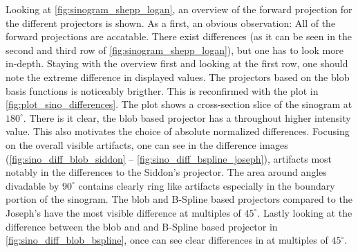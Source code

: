 Looking at \autoref{fig:sinogram_shepp_logan}, an overview of the forward projection for the
different projectors is shown. As a first, an obvious observation: All of the forward projections
are accatable. There exist differences (as it can be seen in the second and third row of
\autoref{fig:sinogram_shepp_logan}), but one has to look more in-depth. Staying with the overview
first and looking at the first row, one should note the extreme difference in displayed values. The
projectors based on the blob basis functions is noticeably brigther. This is reconfirmed with the
plot in \autoref{fig:plot_sino_differences}. The plot shows a cross-section slice of the sinogram at
\(180^\circ\). There is it clear, the blob based projector has a throughout higher intensity value.
This also motivates the choice of absolute normalized differences. Focusing on the overall visible
artifacts, one can see in the difference images
(\autoref{fig:sino_diff_blob_siddon} -- \autoref{fig:sino_diff_bspline_joseph}), artifacts most
notably in the differences to the Siddon's projector. The area around angles divadable by
\(90^\circ\) contains clearly ring like artifacts especially in the boundary portion of the
sinogram. The blob and B-Spline based projectors compared to the Joseph's have the most visible
difference at multiples of \(45^\circ\).
Lastly looking at the difference between the blob and and B-Spline based projector in
\autoref{fig:sino_diff_blob_bspline}, once can see clear differences in at multiples of
\(45^\circ\).

